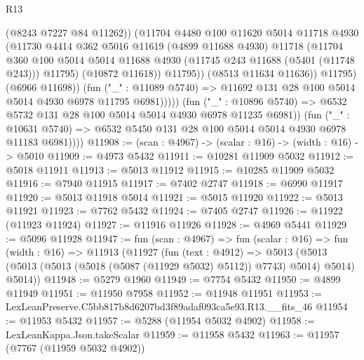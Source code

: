 \begin{lexlean}{R13}
\begin{coremodule}
                              (@8243 @7227 @84 @11262))
                            (@11704
                              @4480
                              @100
                              @11620
                              @5014
                              @11718
                              @4930
                              (@11730
                                @4414
                                @362
                                @5016
                                @11619
                                (@4899 @11688 @4930)
                                @11718
                                (@11704
                                  @360
                                  @100
                                  @5014
                                  @5014
                                  @11688
                                  @4930
                                  (@11745 @243 @11688 (@5401 (@11748 @243)))
                                  @11795)
                                (@10872 @11618))
                              @11795))
                          (@8513 @11634 @11636))
                        @11795)
                      (@6966 @11698))
                    (fun ("_" : @11089 @5740) =>
                    @11692 @131 @28 @100 @5014 @5014 @4930 @6978 @11795 @6981)))))
            (fun ("_" : @10896 @5740) =>
            @6532 @5732 @131 @28 @100 @5014 @5014 @4930 @6978 @11235 @6981))
          (fun ("_" : @10631 @5740) =>
          @6532 @5450 @131 @28 @100 @5014 @5014 @4930 @6978 @11183 @6981))))
@11908 := (scan : @4967) -> (scalar : @16) -> (width : @16) -> @5010
@11909 := @4973 @5432
@11911 := @10281 @11909 @5032
@11912 := @5018 @11911
@11913 := @5013 @11912
@11915 := @10285 @11909 @5032
@11916 := @7940 @11915
@11917 := @7402 @2747
@11918 := @6990 @11917
@11920 := @5013 @11918 @5014
@11921 := @5015 @11920
@11922 := @5013 @11921
@11923 := @7762 @5432
@11924 := @7405 @2747
@11926 := @11922 (@11923 @11924)
@11927 := @11916 @11926
@11928 := @4969 @5441
@11929 := @5096 @11928
@11947 := fun (scan : @4967) =>
  fun (scalar : @16) =>
  fun (width : @16) =>
  @11913
    (@11927
      (fun (text : @4912) =>
      @5013 (@5013 (@5013 (@5013 (@5018 (@5087 (@11929 @5032) @5112)) @7743) @5014) @5014) @5014))
@11948 := @5279 @1960
@11949 := @7754 @5432
@11950 := @4899 @11949
@11951 := @11950 @7958
@11952 := @11948 @11951
@11953 := LexLeanPreserve.C5bb817b8d6207bd3f89adaf093ca5e93.R13.__fits_46
@11954 := @11953 @5432
@11957 := @5288 (@11954 @5032 @4902)
@11958 := LexLeanKappa.Json.takeScalar
@11959 := @11958 @5432
@11963 := @11957 (@7767 (@11959 @5032 @4902))

\end{coremodule}
\end{lexlean}
